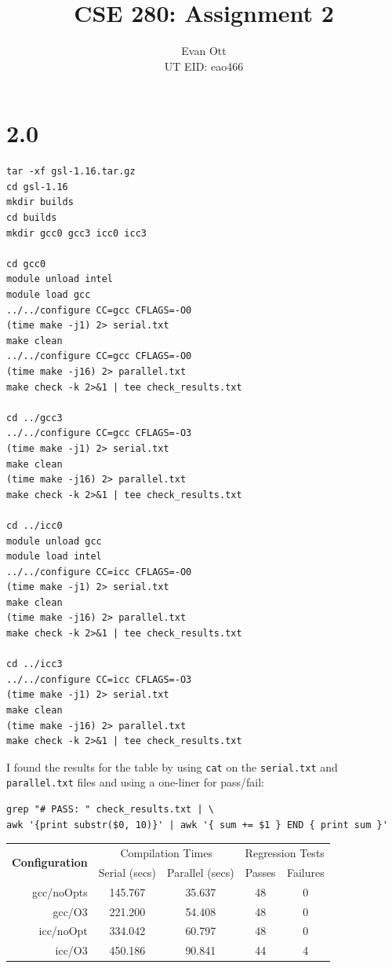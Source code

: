 \documentclass{article}
\title{\vspace{-6ex}CSE 280: Assignment 2\vspace{-2ex}}
\author{Evan Ott \\ UT EID: eao466\vspace{-2ex}}
\begin{document}
\maketitle
\section{2.0}
\begin{verbatim}
tar -xf gsl-1.16.tar.gz 
cd gsl-1.16
mkdir builds
cd builds
mkdir gcc0 gcc3 icc0 icc3

cd gcc0
module unload intel
module load gcc
../../configure CC=gcc CFLAGS=-O0
(time make -j1) 2> serial.txt
make clean
../../configure CC=gcc CFLAGS=-O0
(time make -j16) 2> parallel.txt
make check -k 2>&1 | tee check_results.txt

cd ../gcc3
../../configure CC=gcc CFLAGS=-O3
(time make -j1) 2> serial.txt
make clean
(time make -j16) 2> parallel.txt
make check -k 2>&1 | tee check_results.txt

cd ../icc0
module unload gcc
module load intel
../../configure CC=icc CFLAGS=-O0
(time make -j1) 2> serial.txt
make clean
(time make -j16) 2> parallel.txt
make check -k 2>&1 | tee check_results.txt

cd ../icc3
../../configure CC=icc CFLAGS=-O3
(time make -j1) 2> serial.txt
make clean
(time make -j16) 2> parallel.txt
make check -k 2>&1 | tee check_results.txt
\end{verbatim}

I found the results for the table by using \texttt{cat} on the \texttt{serial.txt} and \texttt{parallel.txt} files and using
a one-liner for pass/fail:
\begin{verbatim}
grep "# PASS: " check_results.txt | \
awk '{print substr($0, 10)}' | awk '{ sum += $1 } END { print sum }'
\end{verbatim}


\begin{table}[h]
\centering
\begin{tabular}{r||c|c|c|c|}
\hline
\multirow{ 2}{*}{\textbf{Configuration}} & \multicolumn{2}{c|}{Compilation Times} & \multicolumn{2}{c|}{Regression Tests}\\
 & Serial (secs) & Parallel (secs) & Passes& Failures\\
\hline
gcc/noOpts & 145.767 & 35.637 & 48 & 0\\ \hline
gcc/O3 & 221.200 & 54.408 & 48 & 0\\ \hline
icc/noOpt & 334.042 & 60.797 & 48 & 0\\ \hline
icc/O3 & 450.186 & 90.841 & 44& 4\\ \hline
\end{tabular}
\end{table}
\end{document}
